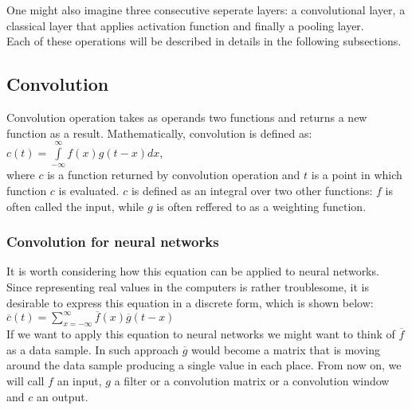 \documentclass[a4paper,10pt]{report}
\begin{document}
	One might also imagine three consecutive seperate layers: a convolutional layer, a classical layer that applies activation function and finally a pooling layer.\\
	
	Each of these operations will be described in details in the following subsections.\\
	
	\subsection{Convolution}\label{sec:convolution}
	Convolution operation takes as operands two functions and returns a new function as a result. Mathematically, convolution is defined as: \\
	
	$c(t) = \int\limits_{-\infty}^\infty f(x)g(t-x)dx$,\\
	
	where $c$ is a function returned by convolution operation and $t$ is a point in which function $c$ is evaluated. $c$ is defined as an integral over two other functions: $f$ is often called the input, while $g$ is often reffered to as a weighting function.\\
	
		
	\subsubsection{Convolution for neural networks}
	  
	  It is worth considering how this equation can be applied to neural networks. Since representing real values in the computers is rather troublesome, it is desirable to express this equation in a discrete form, which is shown below:\\
	  
	  $\overline{c}(t) = \sum\limits_{x = -\infty}^\infty \overline{f}(x)\overline{g}(t-x)$ \\%
	  
	  If we want to apply this equation to neural networks we might want to think of $\overline{f}$ as a data sample. In such approach $\overline{g}$ would become a matrix that is moving around the data sample producing a single value in each place. From now on, we will call $f$ an input, $g$ a filter or a convolution matrix or a convolution window and $c$ an output.\\
	  
\end{document}

